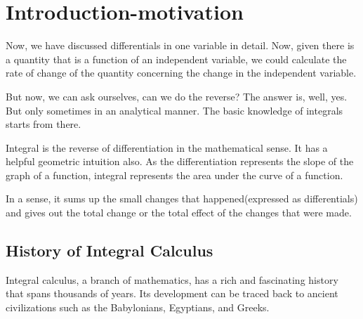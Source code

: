 \chapter{Introduction-motivation}

Now, we have discussed differentials in one variable in detail. Now, given there is a quantity that is a function of an independent variable, we could calculate the rate of change of the quantity concerning the change in the independent variable.

But now, we can ask ourselves, can we do the reverse? The answer is, well, yes. But only sometimes in an analytical manner. The basic knowledge of integrals starts from there. 

Integral is the reverse of differentiation in the mathematical sense. It has a helpful geometric intuition also. As the differentiation represents the slope of the graph of a function, integral represents the area under the curve of a function.

In a sense, it sums up the small changes that happened(expressed as differentials) and gives out the total change or the total effect of the changes that were made. 

\section*{History of Integral Calculus}

Integral calculus, a branch of mathematics, has a rich and fascinating history that spans thousands of years. Its development can be traced back to ancient civilizations such as the Babylonians, Egyptians, and Greeks.

